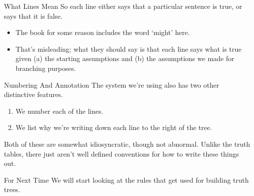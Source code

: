 \documentclass[
  ignorenonframetext,
]{beamer}
\providecommand{\tightlist}{%
  \setlength{\itemsep}{0pt}\setlength{\parskip}{0pt}}
\renewcommand{\,}{\text{, }}
\begin{document}
\begin{frame}{What Lines Mean}
\protect\hypertarget{what-lines-mean}{}
So each line either says that a particular sentence is true, or says
that it is false.

\begin{itemize}
\tightlist
\item
  The book for some reason includes the word `might' here.
\item
  That's misleading; what they should say is that each line says what is
  true given (a) the starting assumptions and (b) the assumptions we
  made for branching purposes.
\end{itemize}
\end{frame}

\begin{frame}{Numbering And Annotation}
\protect\hypertarget{numbering-and-annotation}{}
The system we're using also has two other distinctive features.

\begin{enumerate}
\tightlist
\item
  We number each of the lines. \pause
\item
  We list why we're writing down each line to the right of the tree.
  \pause
\end{enumerate}

Both of these are somewhat idiosyncratic, though not abnormal. Unlike
the truth tables, there just aren't well defined conventions for how to
write these things out.
\end{frame}

\begin{frame}{For Next Time}
\protect\hypertarget{for-next-time}{}
We will start looking at the rules that get used for building truth
trees.
\end{frame}
\end{document}
